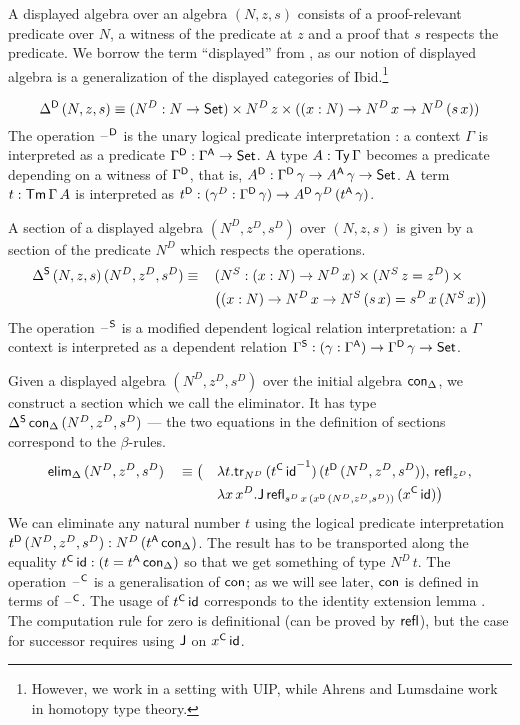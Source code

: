 \documentclass[acmsmall,review,anonymous]{acmart}\settopmatter{printfolios=true,printccs=false,printacmref=false}
\begin{document}
A displayed algebra over an algebra $(N,z,s)$ consists of a
proof-relevant predicate over $N$, a witness of the predicate at $z$
and a proof that $s$ respects the predicate. We borrow the term
``displayed'' from \cite{displayedCategories}, as our notion of
displayed algebra is a generalization of the displayed categories of Ibid.\footnote{However, we work in a setting with UIP, while Ahrens and Lumsdaine work in homotopy type theory.}

\[
\Delta^{\mathsf{D}}\,(N,z,s) \equiv (N^D:N\rightarrow\mathsf{Set})\times N^D\,z\times ((x:N)\rightarrow N^D\,x\rightarrow N^D\,(s\,x))
\]
The operation $\mathord{\hspace{1pt}\text{--}\hspace{1pt}}^{\mathsf{D}}$ is the unary logical predicate
interpretation \cite{bernardy12parametricity}: a context $\Gamma$ is
interpreted as a predicate $\Gamma^{\mathsf{D}}:\Gamma^{\mathsf{A}}\rightarrow\mathsf{Set}$. A type
$A:\mathsf{Ty}\,\Gamma$ becomes a predicate depending on a witness of
$\Gamma^{\mathsf{D}}$, that is, $A^{\mathsf{D}}:\Gamma^{\mathsf{D}}\,\gamma\rightarrow
A^{\mathsf{A}}\,\gamma\rightarrow\mathsf{Set}$. A term $t:\mathsf{Tm}\,\Gamma\,A$ is interpreted as
$t^{\mathsf{D}}:(\gamma^D:\Gamma^{\mathsf{D}}\,\gamma)\rightarrow A^{\mathsf{D}}\,\gamma^D\,(t^{\mathsf{A}}\,\gamma)$.

A section of a displayed algebra $(N^D,z^D,s^D)$ over $(N,z,s)$ is
given by a section of the predicate $N^D$ which respects the
operations.
\begin{alignat*}{5}
  & \Delta^{\mathsf{S}}\,(N,z,s)\,(N^D,z^D,s^D) \equiv\, && (N^S:(x:N)\rightarrow N^D\,x)\times (N^S\,z=z^D)\,\times \\
  & && \big((x:N)\rightarrow N^D\,x\rightarrow N^S\,(s\,x) = s^D\,x\,(N^S\,x)\big)
\end{alignat*}
The operation $\mathord{\hspace{1pt}\text{--}\hspace{1pt}}^{\mathsf{S}}$ is a modified dependent logical relation
interpretation: a $\Gamma$ context is interpreted as a dependent
relation $\Gamma^{\mathsf{S}}:(\gamma:\Gamma^{\mathsf{A}})\rightarrow\Gamma^{\mathsf{D}}\,\gamma\rightarrow\mathsf{Set}$.

Given a displayed algebra $(N^D,z^D,s^D)$ over the initial algebra $\mathsf{con}_\Delta$,
we construct a section which we call the eliminator. It has type
$\Delta^{\mathsf{S}}\,\mathsf{con}_\Delta\,(N^D,z^D,s^D)$ --- the two equations in the
definition of sections correspond to the $\beta$-rules.
\begin{alignat*}{5}
  & \mathsf{elim}_\Delta\,(N^D,z^D,s^D) && \equiv \big( && \lambda t.\mathsf{tr}_{N^D}\,({t^{\mathsf{C}}\,\mathsf{id}}^{-1})\,(t^{\mathsf{D}}\,(N^D,z^D,s^D)),\, \mathsf{refl}_{z^D}, \\
  & && && \lambda x\,x^D. \mathsf{J}\,\mathsf{refl}_{s^D\,x\,(x^{\mathsf{D}}\,(N^D,z^D,s^D))}\,(x^{\mathsf{C}}\,\mathsf{id})\big)
\end{alignat*}
We can eliminate any natural number $t$ using the logical predicate
interpretation $t^{\mathsf{D}}\,(N^D,z^D,s^D): N^D\,(t^{\mathsf{A}}\,\mathsf{con}_\Delta)$. The
result has to be transported along the equality $t^{\mathsf{C}}\,\mathsf{id} : (t =
t^{\mathsf{A}}\,\mathsf{con}_\Delta)$ so that we get something of type $N^D\,t$. The
operation $\mathord{\hspace{1pt}\text{--}\hspace{1pt}}^{\mathsf{C}}$ is a generalisation of $\mathsf{con}$; as we will see
later, $\mathsf{con}$ is defined in terms of $\mathord{\hspace{1pt}\text{--}\hspace{1pt}}^{\mathsf{C}}$. The usage of
$t^{\mathsf{C}}\,\mathsf{id}$ corresponds to the identity extension lemma
\cite{atkey}. The computation rule for zero is definitional (can be
proved by $\mathsf{refl}$), but the case for successor requires using $\mathsf{J}$ on
$x^{\mathsf{C}}\,\mathsf{id}$.
\end{document}
